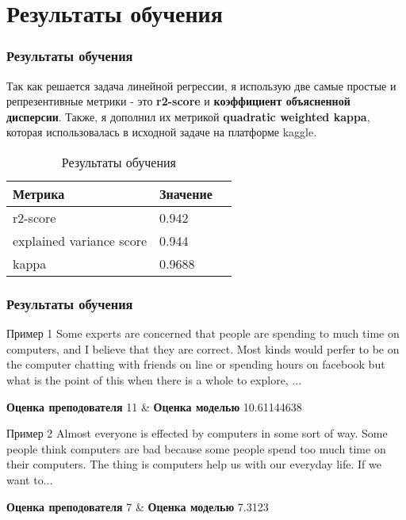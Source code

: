 \documentclass{beamer}
\begin{document}
\section{Результаты обучения}
\begin{frame}
  \frametitle{Результаты обучения}
  Так как решается задача линейной регрессии, я использую две самые простые и
  репрезентивные метрики - это \textbf{r2-score} и \textbf{коэффициент объясненной дисперсии}.
  Также, я дополнил их метрикой \textbf{quadratic weighted kappa}, которая использовалась
  в исходной задаче на платформе kaggle.
  \begin{table}
    \begin{tabular}{l l l}
      \toprule
      \textbf{Метрика} & \textbf{Значение}\\
      \midrule
      r2-score & 0.942 \\
      explained variance score & 0.944 \\
      kappa & 0.9688 \\
      \bottomrule
    \end{tabular}
    \caption{Результаты обучения}
  \end{table}
\end{frame}


\begin{frame}
  \frametitle{Результаты обучения}
\begin{block}{Пример 1}
  Some experts are concerned that people are spending to much time on computers,
  and I believe that they are correct. Most kinds would perfer to be on the
  computer chatting with friends on line or spending hours on facebook but what
  is the point of this when there is a whole to explore,  ... 
\end{block}
\textbf{Оценка преподователя} 11 & \textbf{Оценка моделью} 10.61144638
\begin{block}{Пример 2}
  Almost everyone is effected by computers in some sort of way. Some people think
  computers are bad because some people spend too much time on their computers.
  The thing is computers help us with our everyday life. If we want to...
\end{block}
\textbf{Оценка преподователя}  7 & \textbf{Оценка моделью} 7.3123
\end{frame}

\end{document}
